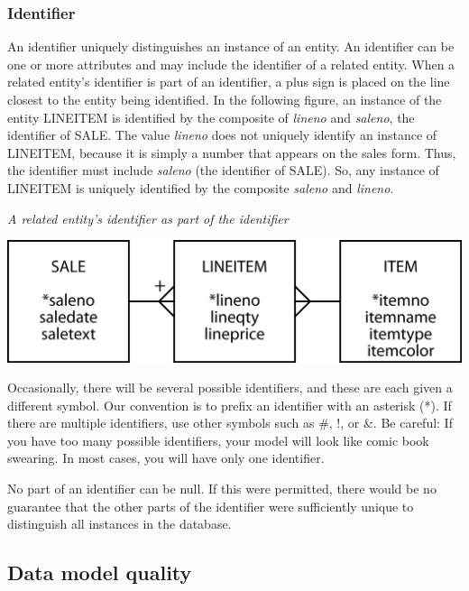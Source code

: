 \documentclass[
]{article}
\begin{document}
\hypertarget{identifier}{%
\subsubsection*{Identifier}\label{identifier}}

An identifier uniquely distinguishes an instance of an entity. An
identifier can be one or more attributes and may include the identifier
of a related entity. When a related entity's identifier is part of an
identifier, a plus sign is placed on the line closest to the entity
being identified. In the following figure, an instance of the entity
LINEITEM is identified by the composite of \emph{lineno} and \emph{saleno}, the
identifier of SALE. The value \emph{lineno} does not uniquely identify an
instance of LINEITEM, because it is simply a number that appears on the
sales form. Thus, the identifier must include \emph{saleno} (the identifier
of SALE). So, any instance of LINEITEM is uniquely identified by the
composite \emph{saleno} and \emph{lineno}.

\emph{A related entity's identifier as part of the identifier}

\includegraphics[width=5.84375in,height=\textheight]{Figures/Chapter 5/sale-item.png}

Occasionally, there will be several possible identifiers, and these are
each given a different symbol. Our convention is to prefix an identifier
with an asterisk (*). If there are multiple identifiers, use other
symbols such as \#, !, or \&. Be careful: If you have too many possible
identifiers, your model will look like comic book swearing. In most
cases, you will have only one identifier.

No part of an identifier can be null. If this were permitted, there
would be no guarantee that the other parts of the identifier were
sufficiently unique to distinguish all instances in the database.

\hypertarget{data-model-quality}{%
\subsection*{Data model quality}\label{data-model-quality}}
\end{document}

